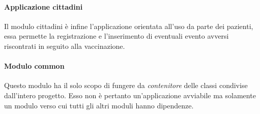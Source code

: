 	\paragraph{Applicazione cittadini}
	Il modulo cittadini è infine l'applicazione orientata all'uso da parte dei pazienti, essa permette la registrazione e l'inserimento di eventuali evento avversi riscontrati in seguito alla vaccinazione.
	
	
	\paragraph{Modulo common}
	Questo modulo ha il solo scopo di fungere da \emph{contenitore} delle classi condivise dall'intero progetto.
	Esso non è pertanto un'applicazione avviabile ma solamente un modulo verso cui tutti gli altri moduli hanno dipendenze.